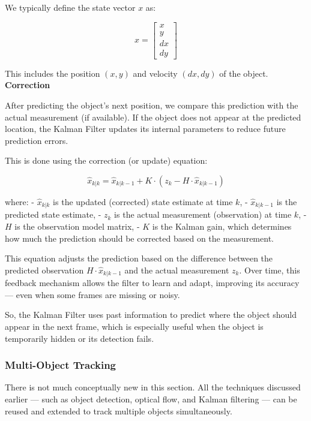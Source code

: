 \documentclass[a4paper,12pt]{article}
\begin{document}
We typically define the state vector \( x \) as:

\[
x = \begin{bmatrix}
    x \\
    y \\
    dx \\
    dy
\end{bmatrix}
\]

This includes the position \( (x, y) \) and velocity \( (dx, dy) \) of the object. \\[0.5cm]
\textbf{Correction}

After predicting the object's next position, we compare this prediction with the actual measurement (if available).  
If the object does not appear at the predicted location, the Kalman Filter updates its internal parameters to reduce future prediction errors.

This is done using the correction (or update) equation:

\[
\hat{x}_{k|k} = \hat{x}_{k|k-1} + K \cdot (z_k - H \cdot \hat{x}_{k|k-1})
\]

where:
- \( \hat{x}_{k|k} \) is the updated (corrected) state estimate at time \( k \),
- \( \hat{x}_{k|k-1} \) is the predicted state estimate,
- \( z_k \) is the actual measurement (observation) at time \( k \),
- \( H \) is the observation model matrix,
- \( K \) is the Kalman gain, which determines how much the prediction should be corrected based on the measurement.

This equation adjusts the prediction based on the difference between the predicted observation \( H \cdot \hat{x}_{k|k-1} \) and the actual measurement \( z_k \).  
Over time, this feedback mechanism allows the filter to learn and adapt, improving its accuracy — even when some frames are missing or noisy.

So, the Kalman Filter uses past information to predict where the object should appear in the next frame, which is especially useful when the object is temporarily hidden or its detection fails.

\subsubsection{Multi-Object Tracking}

There is not much conceptually new in this section. All the techniques discussed earlier — such as object detection, optical flow, and Kalman filtering — can be reused and extended to track multiple objects simultaneously.
\end{document}
